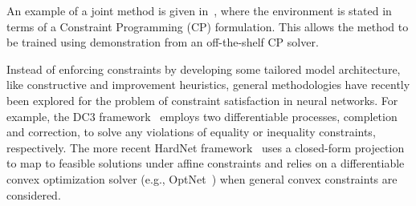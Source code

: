 \documentclass{article}
\theoremstyle{definition}
\theoremstyle{plain}
\begin{document}
An example of a joint method is given in~\cite{tasselEndEndReinforcementLearning2023}, where the environment is stated in
terms of a Constraint Programming (CP) formulation. This allows the method to be
trained using demonstration from an off-the-shelf CP solver.

Instead of enforcing constraints by developing some tailored model architecture,
like constructive and improvement heuristics, general methodologies have
recently been explored for the problem of constraint satisfaction in neural
networks. For example, the DC3 framework~\cite{dontiDC3LearningMethod2021}
employs two differentiable processes, completion and correction, to solve any
violations of equality or inequality constraints, respectively. The more recent
HardNet framework~\cite{minHardConstrainedNeuralNetworks2024} uses a closed-form
projection to map to feasible solutions under affine constraints and relies on a
differentiable convex optimization solver (e.g.,
OptNet~\cite{amosOptNetDifferentiableOptimization2021}) when general convex
constraints are considered.
\end{document}

